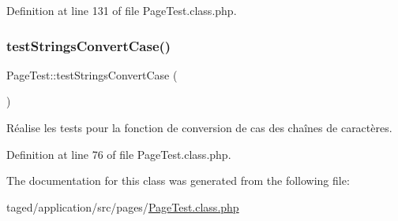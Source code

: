 Definition at line 131 of file Page\+Test.\+class.\+php.

\mbox{\label{class_page_test_aeea79500b4f16c79da7bc4ce360268fb}} 
\subsubsection{\texorpdfstring{test\+Strings\+Convert\+Case()}{testStringsConvertCase()}}
{\footnotesize\ttfamily Page\+Test\+::test\+Strings\+Convert\+Case (\begin{DoxyParamCaption}{ }\end{DoxyParamCaption})\hspace{0.3cm}{\ttfamily [protected]}}

Réalise les tests pour la fonction de conversion de cas des chaînes de caractères. 

Definition at line 76 of file Page\+Test.\+class.\+php.



The documentation for this class was generated from the following file\+:\begin{DoxyCompactItemize}
\item 
taged/application/src/pages/\hyperlink{_page_test_8class_8php}{Page\+Test.\+class.\+php}\end{DoxyCompactItemize}

